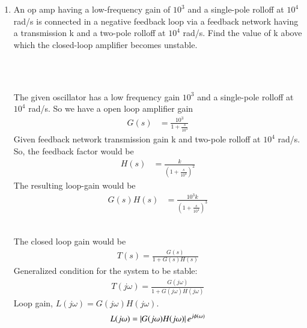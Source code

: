 
\begin{enumerate}[label=\thesection.\arabic*.,ref=\thesection.\theenumi]

\item An op amp having a low-frequency gain of $10^{3}$ and a single-pole rolloff at $10^{4}$ rad/s is connected in a negative feedback loop via a feedback network having a transmission k and a two-pole rolloff at $10^{4}$ rad/s. Find the value of k above which the closed-loop amplifier becomes unstable.

\\
\solution 
\begin{figure}[!ht]
	\begin{center}
		\resizebox{\columnwidth}{!}{}
	\end{center}
\caption{}
\label{fig:ee18btech11006_1}
\end{figure} \\
The given oscillator has a low frequency gain $10^3$ and a single-pole rolloff at $10^4$ rad/s. So we have a open loop amplifier gain 
\begin{align}
G(s)&= \frac{10^3}{1+\frac{s}{10^4}}
\end{align}
Given feedback network transmission gain k and two-pole rolloff at $10^4$ rad/s. So, the feedback factor would be
\begin{align}
H(s)&= \frac{k}{\left(1+\frac{s}{10^4}\right)^2}   
\end{align}
The resulting loop-gain would be 
\begin{align}
G(s)H(s) &= \frac{10^3k}{\left(1+\frac{s}{10^4}\right)^3}
\end{align}
\begin{table}[!ht]
\centering

\caption{}
\label{table:ee18btech11006_Factors}
\end{table}\\
The closed loop gain would be
\begin{align}
T(s)=\frac{G(s)}{1+G(s)H(s)}
\end{align}
Generalized condition for the system to be stable:
\begin{align}
T(j\omega)=\frac{G(j\omega)}{1+G(j\omega)H(j\omega)}
\end{align}
Loop gain, $L(j\omega)=G(j\omega)H(j\omega)$.
\begin{align}
L(j\omega)=\left\vert{G(j\omega)H(j\omega)}\right\vert e^{j\phi(\omega)}
\end{align}

\end{enumerate}
